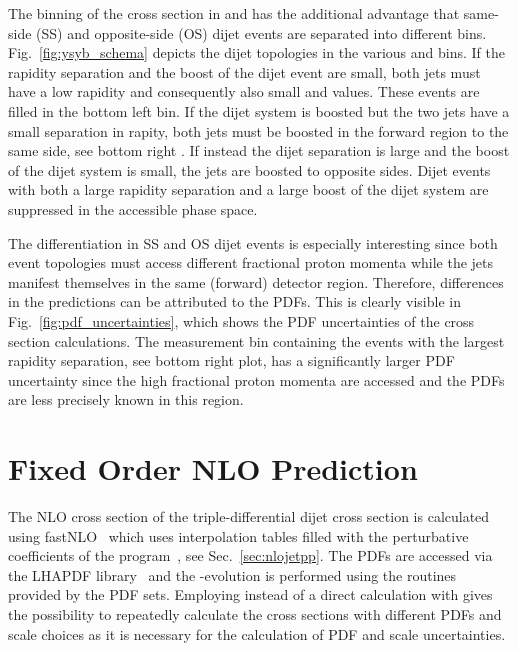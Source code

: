 The binning of the cross section in \ystar and \yboost has the additional
advantage that same-side (SS) and opposite-side (OS) dijet events are separated into
different bins. Fig.~\ref{fig:ysyb_schema} depicts the dijet topologies in the
various \ystar and \yboost bins. If the rapidity separation and the boost of the
dijet event are small, both jets must have a low rapidity and consequently also
small \ystar and \yboost values. These events are filled in the bottom left bin.
If the dijet system is boosted but the two jets have a small separation in
rapity, both jets must be boosted in the forward region to the same side, see
bottom right . If instead the dijet separation is large and the boost of the
dijet system is small, the jets are boosted to opposite sides. Dijet events with
both a large rapidity separation and a large boost of the dijet system are
suppressed in the accessible phase space.

The differentiation in SS and OS dijet events is especially interesting since
both event topologies must access different fractional proton momenta while the
jets manifest themselves in the same (forward) detector region. Therefore,
differences in the predictions can be attributed to the PDFs. This is clearly
visible in Fig.~\ref{fig:pdf_uncertainties}, which shows the PDF uncertainties of
the cross section calculations. The measurement bin containing the events with
the largest rapidity separation, see bottom right plot, has a significantly larger
PDF uncertainty since the high fractional proton momenta are accessed and the
PDFs are less precisely known in this region.

\section{Fixed Order NLO Prediction}

The NLO cross section of the triple-differential dijet cross section is
calculated using fastNLO~\cite{Kluge:2006xs,Britzger:2012bs} which uses
interpolation tables filled with the perturbative coefficients of the \NLOJETPP
program~\cite{Nagy:2003tz}, see Sec.~\ref{sec:nlojetpp}. The PDFs are accessed
via the LHAPDF library~\cite{Whalley:2005nh,Buckley:2014ana} and the
\as-evolution is performed using the routines provided by the PDF sets.
Employing \fastNLO instead of a direct calculation with \NLOJETPP gives the
possibility to repeatedly calculate the cross sections with  different PDFs and
scale choices as it is necessary for the calculation of PDF and scale
uncertainties.

